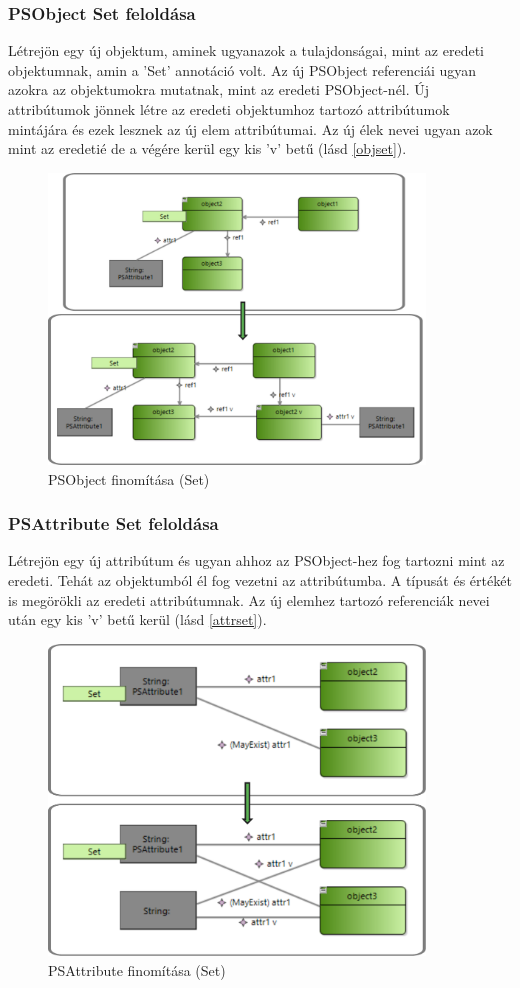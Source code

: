 \subsubsection{PSObject Set feloldása}
Létrejön egy új objektum, aminek ugyanazok a tulajdonságai, mint az eredeti objektumnak, amin a 'Set' annotáció volt. Az új PSObject referenciái ugyan azokra az objektumokra mutatnak, mint az eredeti PSObject-nél. Új attribútumok jönnek létre az eredeti objektumhoz tartozó attribútumok mintájára és ezek lesznek az új elem attribútumai. Az új élek nevei ugyan azok mint az eredetié de a végére kerül egy kis 'v' betű (lásd \autoref{objset}).
\begin{figure}[!ht]
	\centering
	\includegraphics[width=100mm]{figures/objset.pdf}
	\caption{PSObject finomítása (Set)}
	\label{objset} 
\end{figure}

\subsubsection{PSAttribute Set feloldása}
Létrejön egy új attribútum és ugyan ahhoz az PSObject-hez fog tartozni mint az eredeti. Tehát az objektumból él fog vezetni az attribútumba. A típusát és értékét is megörökli az eredeti attribútumnak. Az új elemhez tartozó referenciák nevei után egy kis 'v' betű kerül (lásd \autoref{attrset}).
\begin{figure}[!ht]
	\centering
	\includegraphics[width=100mm]{figures/attrset.pdf}
	\caption{PSAttribute finomítása (Set)}
	\label{attrset} 
\end{figure}

